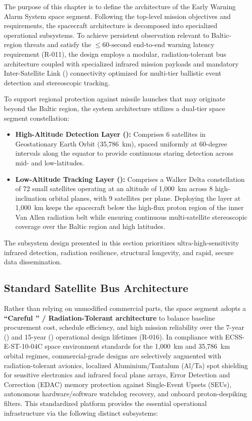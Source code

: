 The purpose of this chapter is to define the architecture of the Early Warning Alarm System space segment. Following the top-level mission objectives and requirements, the spacecraft architecture is decomposed into specialized operational subsystems. To achieve persistent observation relevant to Baltic-region threats and satisfy the $\le 60\text{-second}$ end-to-end warning latency requirement (R-011), the design employs a modular, radiation-tolerant bus architecture coupled with specialized infrared mission payloads and mandatory Inter-Satellite Link () connectivity optimized for multi-tier ballistic event detection and stereoscopic tracking.

To support regional protection against missile launches that may originate beyond the Baltic region, the system architecture utilizes a dual-tier space segment constellation:
\begin{itemize}
    \item \textbf{High-Altitude Detection Layer ():} Comprises 6 satellites in Geostationary Earth Orbit (35,786~km), spaced uniformly at 60-degree intervals along the equator to provide continuous staring detection across mid- and low-latitudes.
    \item \textbf{Low-Altitude Tracking Layer ():} Comprises a Walker Delta constellation of 72 small satellites operating at an altitude of 1,000~km across 8 high-inclination orbital planes, with 9 satellites per plane. Deploying the  layer at 1,000~km keeps the spacecraft below the high-flux proton region of the inner Van Allen radiation belt while ensuring continuous multi-satellite stereoscopic coverage over the Baltic region and high latitudes.
\end{itemize}
The subsystem design presented in this section prioritizes ultra-high-sensitivity infrared detection, radiation resilience, structural longevity, and rapid, secure data dissemination.

\subsection{Standard Satellite Bus Architecture}
Rather than relying on unmodified commercial parts, the  space segment adopts a \textbf{``Careful '' / Radiation-Tolerant  architecture} to balance baseline procurement cost, schedule efficiency, and high mission reliability over the 7-year () and 15-year () operational design lifetimes (R-016). In compliance with ECSS-E-ST-10-04C space environment standards for the 1,000~km  and 35,786~km  orbital regimes, commercial-grade designs are selectively augmented with radiation-tolerant avionics, localized Aluminium/Tantalum (Al/Ta) spot shielding for sensitive electronics and infrared focal plane arrays, Error Detection and Correction (EDAC) memory protection against Single-Event Upsets (SEUs), autonomous hardware/software watchdog recovery, and onboard proton-despiking filters. This standardized platform provides the essential operational infrastructure via the following distinct subsystems:

